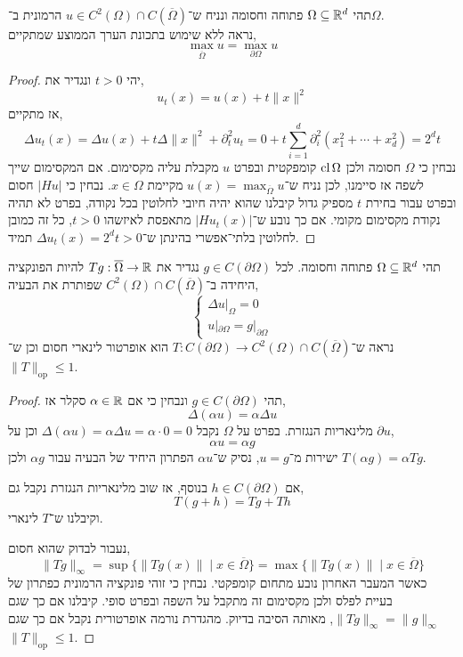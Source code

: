 \question{}
תהי $\Omega \subseteq \mathbb{R}^d$ פתוחה וחסומה ונניח ש־$u \in C^2(\Omega) \cap C(\overline{\Omega})$ הרמונית ב־$\Omega$. \\
נראה ללא שימוש בתכונת הערך הממוצע שמתקיים,
\[
	\max_{\overline{\Omega}} u
	= \max_{\partial \Omega} u
\]
\begin{proof}
	יהי $t > 0$ ונגדיר את,
	\[
		u_t(x)
		= u(x) + t \lVert x \rVert^2
	\]
	אז מתקיים,
	\[
		\Delta u_t(x)
		= \Delta u(x) + t \Delta \lVert x \rVert^2 + \partial_t^2 u_t
		= 0 + t \sum_{i = 1}^d \partial_i^2 (x_1^2 + \cdots + x_d^2)
		= 2^d t
	\]
	נבחין כי $\Omega$ חסומה ולכן $\operatorname{cl} \Omega$ קומפקטית ובפרט $u$ מקבלת עליה מקסימום.
	אם המקסימום שייך לשפה אז סיימנו, לכן נניח ש־$u(x) = \max_{\overline{\Omega}} u$ מקיימת $x \in \Omega$.
	נבחין כי $|H u|$ חסום ובפרט עבור בחירת $t$ מספיק גדול קיבלנו שהוא יהיה חיובי לחלוטין בכל נקודה, בפרט לא תהיה נקודת מקסימום מקומי.
	אם כך נובע ש־$|H u_t(x)|$ מתאפסת לאיזשהו $t > 0$, כל זה כמובן לחלוטין בלתי־אפשרי בהינתן ש־$\Delta u_t(x) = 2^d t > 0$ תמיד.
\end{proof}

\question{}
תהי $\Omega \subseteq \mathbb{R}^d$ פתוחה וחסומה.
לכל $g \in C(\partial \Omega)$ נגדיר את $T g : \overline{\Omega} \to \mathbb{R}$ להיות הפונקציה היחידה ב־$C^2(\Omega) \cap C(\overline{\Omega})$ שפותרת את הבעיה,
\[
	\begin{cases}
		\Delta u|_{\Omega} = 0 \\
		u |_{\partial \Omega} = g |_{\partial \Omega}
	\end{cases}
\]
נראה ש־$T : C(\partial \Omega) \to C^2(\Omega) \cap C(\overline{\Omega})$ הוא אופרטור לינארי חסום וכן ש־$\lVert T \rVert_{\operatorname{op}} \le 1$.
\begin{proof}
	תהי $g \in C(\partial \Omega)$ ונבחין כי אם $\alpha \in \mathbb{R}$ סקלר אז,
	\[
		\Delta (\alpha u)
		= \alpha \Delta u
	\]
	מלינאריות הנגזרת.
	בפרט על $\Omega$ נקבל $\Delta(\alpha u) = \alpha \Delta u = \alpha \cdot 0 = 0$ וכן על $\partial u$,
	\[
		\alpha u = \alpha g
	\]
	ישירות מ־$u = g$, נסיק ש־$\alpha u$ הפתרון היחיד של הבעיה עבור $\alpha g$ ולכן $T(\alpha g) = \alpha T g$.

	אם $h \in C(\partial \Omega)$ בנוסף, אז שוב מלינאריות הנגזרת נקבל גם,
	\[
		T(g + h)
		= Tg + Th
	\]
	וקיבלנו ש־$T$ לינארי.

	נעבור לבדוק שהוא חסום,
	\[
		\lVert T g \rVert_{\infty}
		= \sup\{ \lVert T g(x) \rVert \mid x \in \overline{\Omega} \}
		= \max\{ \lVert T g(x) \rVert \mid x \in \overline{\Omega} \}
	\]
	כאשר המעבר האחרון נובע מתחום קומפקטי.
	נבחין כי זוהי פונקציה הרמונית כפתרון של בעיית לפלס ולכן מקסימום זה מתקבל על השפה ובפרט סופי.
	קיבלנו אם כך שגם $\lVert T g \rVert_\infty = \lVert g \rVert_\infty$, מאותה הסיבה בדיוק.
	מהגדרת נורמה אופרטורית נקבל אם כך שגם $\lVert T \rVert_{\operatorname{op}} \le 1$.
\end{proof}


